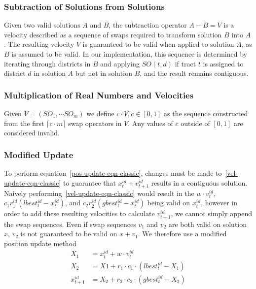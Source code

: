 \documentclass[journal]{IEEEtran}
\begin{document}
\subsubsection{Subtraction of Solutions from Solutions}
Given two valid solutions $A$ and $B$, the subtraction operator $A - B = V$ is a
velocity described as a sequence of swaps required to transform solution $B$
into $A$.  The resulting velocity $V$ is guaranteed to be valid when applied to
solution $A$, as $B$ is assumed to be valid.  In our implementation, this
sequence is determined by iterating through districts in $B$ and applying $SO(t,
d)$ if tract $t$ is assigned to district $d$ in solution $A$ but not in solution
$B$, and the result remains contiguous.\\

\subsubsection{Multiplication of Real Numbers and Velocities}
Given $V = (SO_1, \cdots SO_m)$ we define $c \cdot V, c \in [0, 1]$ as the
sequence constructed from the first $\lceil c\cdot m \rceil$ swap operators in
$V$.  Any values of $c$ outside of $[0, 1]$ are considered invalid.\\

\subsubsection{Modified Update}
To perform equation~\ref{pos-update-eqn-classic}, changes must be made
to~\ref{vel-update-eqn-classic} to guarantee that $x_{t}^{id} + v_{t + 1}^{id}$
results in a contiguous solution. Naively
performing~\ref{vel-update-eqn-classic} would result in the $w \cdot v_t^{id}$,
$c_1r_1^{id}(lbest_t^{id} - x_t^{id})$, and $c_2r_2^{id}(gbest_t^{id} -
x_t^{id})$ being valid on $x_t^{id}$, however in order to add these resulting
velocities to calculate $v_{t + 1}^{id}$, we cannot simply append the swap
sequences.  Even if swap sequences $v_1$ and $v_2$ are both valid on solution
$x$, $v_2$ is not guaranteed to be valid on $x + v_1$.  We therefore use a
modified position update method
\begin{equation}
\begin{aligned}
X_1 &= x_{t}^{id} + w \cdot v_{t}^{id}\\
X_2 &= X1 + r_1 \cdot c_1 \cdot (lbest_{t}^{id} - X_1)\\
x_{t + 1}^{id} &= X_2 + r_2 \cdot c_2 \cdot (gbest_t^{id} - X_2)\\
\end{aligned}
\end{equation}
\end{document}
